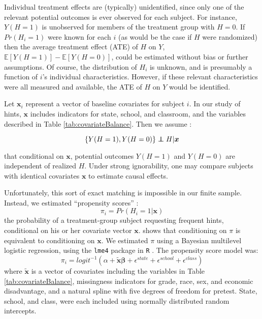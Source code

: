 \documentclass{article}\usepackage[]{graphicx}\usepackage[]{color}
\newcommand{\EE}{\mathbb{E}}
\newenvironment{ass}[2][Assumption:]{\begin{trivlist}
\item[\hskip \labelsep {\bfseries #1}\hskip \labelsep {\bfseries #2}.]}{\end{trivlist}}
\def\independenT#1#2{\mathrel{\rlap{$#1#2$}\mkern2mu{#1#2}}}
\newcommand\independent{\protect\mathpalette{\protect\independenT}{\perp}}
\begin{document}
Individual treatment effects are (typically) unidentified, since only
one of the relevant potential outcomes is ever observed for each
subject.
For instance, $Y(H=1)$ is unobserved for members of the
treatment group with $H=0$.
If $Pr(H_i=1)$ were known for each $i$ (as would be the case if $H$
were randomized) then the average treatment effect (ATE) of $H$ on $Y$,
$\EE[Y(H=1)]-\EE[Y(H=0)]$, could be estimated without bias or further
assumptions.
Of course, the distribution of $H_i$ is unknown, and is presumably a
function of $i$'s individual characteristics.
However, if these relevant characteristics were all measured and
available, the ATE of $H$ on $Y$ would be identified.

Let $\bm{x}_i$ represent a vector of baseline covariates for subject $i$.
In our study of hints, $\bm{x}$ includes indicators for state, school,
and classroom, and the variables described in Table \ref{tab:covariateBalance}.
Then we assume \citep[c.f.][]{rosenbaum1983central}:
\begin{ass}{Strong Ignorability}
\begin{equation*}
 \{Y(H=1),Y(H=0)\}\independent H |\bm{x}
\end{equation*}
\end{ass}
that conditional on $\bm{x}$, potential outcomes $Y(H=1)$ and $Y(H=0)$
are independent of realized $H$.
Under strong ignorability, one may compare subjects with identical
covariates $\bm{x}$ to estimate causal effects.

Unfortunately, this sort of exact matching is impossible in our finite
sample.
Instead, we estimated ``propensity scores'' \citep{rosenbaum1983central}:
\begin{equation*}
\pi_i=Pr(H_i=1|\bm{x})
\end{equation*}
the probability of a treatment-group subject requesting frequent hints, conditional on
his or her covariate vector $\bm{x}$.
\citet{rosenbaum1983central} shows that conditioning on $\pi$ is
equivalent to conditioning on $\bm{x}$.
We estimated $\pi$ using a Bayesian multilevel logistic regression,
using the \texttt{lme4} package in
\texttt{R} \citep{lme4}.
The propensity score model was:
\begin{equation*}
\pi_i=logit^{-1}(\alpha+\bm{\tilde{x}}\bm{\beta}+\epsilon^{state}+\epsilon^{school}+\epsilon^{class})
\end{equation*}
where $\bm{\tilde{x}}$ is a vector of covariates including the
variables in Table \ref{tab:covariateBalance}, missingness
indicators for grade, race, sex, and economic disadvantage, and
a natural spline with five degrees of freedom for pretest.
State, school, and class, were each included using normally
distributed random intercepts.
\end{document}
